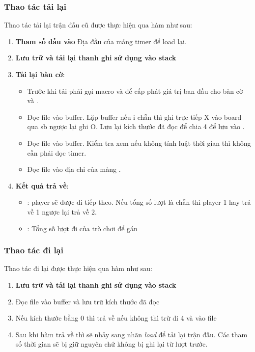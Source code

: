 \subsubsection{Thao tác tải lại}
Thao tác tải lại trận đấu cũ được thực hiện qua hàm  như sau:
\begin{enumerate}
   \item \textbf{Tham số đầu vào}  Địa đầu của mảng timer để load lại.
   \item \textbf{Lưu trữ và tải lại thanh ghi sử dụng vào stack}
   \item \textbf{Tải lại bàn cờ}: 
   \begin{itemize}
      \item Trước khi tải phải gọi macro  và  để cấp phát giá trị ban đầu cho bàn cờ và . 
      \item Đọc file  vào buffer. Lặp buffer nếu i chẵn thì ghi trực tiếp X vào board qua sb ngược lại ghi O. Lưu lại kích thước đã đọc để chia 4 để lưu vào .
      \item Đọc file  vào buffer. Kiểm tra xem nếu không tính luật thời gian thì không cần phải đọc timer.
      \item Đọc file  vào địa chỉ của mảng .
   \end{itemize}
   \item \textbf{Kết quả trả về}:
   \begin{itemize}
   \item {}: player sẽ được đi tiếp theo. Nếu tổng số lượt là chẵn thì player 1 hay trả về 1 ngược lại trả về 2.
   \item {}: Tổng số lượt đi của trò chơi để gán 
   \end{itemize}
\end{enumerate}
\subsubsection{Thao tác đi lại}
Thao tác đi lại được thực hiện qua hàm  như sau:
\begin{enumerate}
   \item \textbf{Lưu trữ và tải lại thanh ghi sử dụng vào stack}
   \item Đọc file  vào buffer và lưu trữ kích thước đã đọc
   \item Nếu kích thước bằng 0 thì trả về nếu không thì trừ đi 4 và vào file 
   \item Sau khi hàm trả về thì sẽ nhảy sang nhãn \textit{load} để tải lại trận đấu. Các tham số thời gian sẽ bị giữ nguyên chứ không bị ghi lại từ lượt trước.
\end{enumerate}

